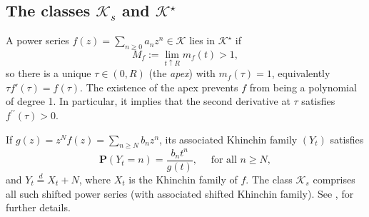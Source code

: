 \documentclass[11pt,a4paper,leqno]{amsart}
\theoremstyle{plain}
\theoremstyle{definition}
\numberwithin{equation}{section}
\def\P{\mathbf{P}}
\begin{document}
	\subsection{The classes \(\mathcal K_s\) and \(\mathcal K^\star\)}
	
	A power series \(f(z)=\sum_{n\ge0}a_nz^n\in\mathcal K\) lies in \(\mathcal K^\star\) if 
	\[
	M_f:=\lim_{t\uparrow R}m_f(t)>1,
	\]
	so there is a unique \(\tau\in(0,R)\) (the \emph{apex}) with \(m_f(\tau)=1\), equivalently \(\tau f'(\tau)=f(\tau)\). 
	The existence of the apex prevents \( f \) from being a polynomial of degree 1. In particular, it implies that the second derivative at \( \tau \) satisfies \( f^{\prime\prime}(\tau) > 0 \). 
	\smallskip
	
	If \(g(z)=z^Nf(z)=\sum_{n\ge N}b_nz^n\), its associated Khinchin family \((Y_t)\) satisfies
	\[
	\P(Y_t=n)=\frac{b_nt^n}{g(t)},\quad \text{ for all } n\ge N,
	\]
	and \(Y_t\overset d= X_t+N\), where \(X_t\) is the Khinchin family of \(f\). The class \(\mathcal K_s\) comprises all such shifted power series (with associated shifted Khinchin family). See \cite{K_dos}, for further details. 
	
\end{document}
